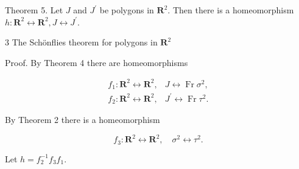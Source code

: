 Theorem 5. Let $J$ and $J^{\prime}$ be polygons in $\mathbf{R}^{2}$. Then there is a homeomorphism $h: \mathbf{R}^{2} \leftrightarrow \mathbf{R}^{2}, J \leftrightarrow J^{\prime}$.

3 The Schönflies theorem for polygons in $\mathbf{R}^{2}$

Proof. By Theorem 4 there are homeomorphisms

$$
\begin{array}{ll}
f_{1}: \mathbf{R}^{2} \leftrightarrow \mathbf{R}^{2}, & J \leftrightarrow \operatorname{Fr} \sigma^{2}, \\
f_{2}: \mathbf{R}^{2} \leftrightarrow \mathbf{R}^{2}, & J^{\prime} \leftrightarrow \operatorname{Fr} \tau^{2} .
\end{array}
$$

By Theorem 2 there is a homeomorphism

$$
f_{3}: \mathbf{R}^{2} \leftrightarrow \mathbf{R}^{2}, \quad \sigma^{2} \leftrightarrow \tau^{2} .
$$

Let $h=f_{2}^{-1} f_{3} f_{1}$.\\

